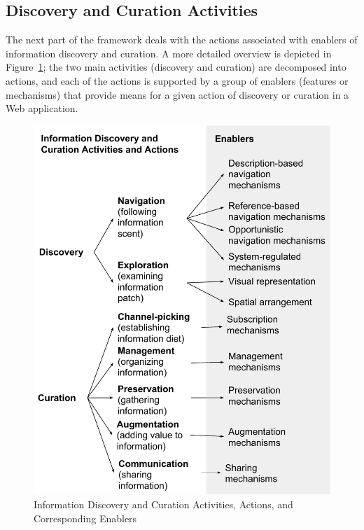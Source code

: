 \documentclass[review]{elsarticle}
\begin{document}
{\subsection{Discovery and Curation Activities}

The next part of the framework deals with the actions associated with enablers of information discovery and curation. A more detailed overview is depicted in Figure~\ref{fig:enablers}; the two main activities (discovery and curation) are decomposed into actions, and each of the actions is supported by a group of enablers (features or mechanisms) that provide means for a given action of discovery or curation in a Web application.


\begin{figure}[htp!]
	\noindent
	\centering
    \includegraphics[width=\linewidth]{figures/framework_enablers.pdf}
	\caption{Information Discovery and Curation Activities, Actions, and Corresponding Enablers}
	\label{fig:enablers} 
\end{figure}

}
\end{document}
